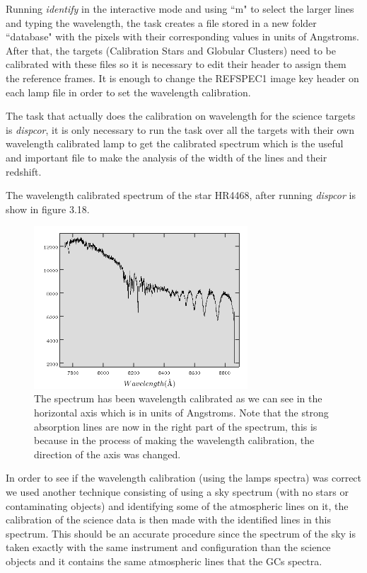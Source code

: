 Running \textit{identify} in the interactive mode and using ``m" to select the larger lines and typing the wavelength, the task creates a file stored in a new folder ``database" with the pixels with their corresponding values in units of Angstroms. After that, the targets (Calibration Stars and Globular Clusters) need to be calibrated with these files so it is necessary to edit their header to assign them the reference frames. It is enough to change the REFSPEC1 image key header on each lamp file in order to set the wavelength calibration. 

The task that actually does the calibration on wavelength for the science targets is \textit{dispcor}, it is only necessary to run the task over all the targets with their own wavelength calibrated lamp to get the calibrated spectrum which is the useful and important file to make the analysis of the width of the lines and their redshift.

The wavelength calibrated spectrum of the star HR4468, after running \textit{dispcor} is show in figure 3.18.

\begin{figure}[H]
\centering
\includegraphics[width=8cm]{images/calib_star_wave.png}
\caption[Wavelength calibrated spectrum of HR4468]{The spectrum has been wavelength calibrated as we can see in the horizontal axis which is in units of Angstroms. Note that the strong absorption lines are now in the right part of the spectrum, this is because in the process of making the wavelength calibration, the direction of the axis was changed.}
\end{figure}

In order to see if the wavelength calibration (using the lamps spectra) was correct we used another technique consisting of using a sky spectrum (with no stars or contaminating objects) and identifying some of the atmospheric lines on it, the calibration of the science data is then made with the identified lines in this spectrum. This should be an accurate procedure since the spectrum of the sky is taken exactly with the same instrument and configuration than the science objects and it contains the same atmospheric lines that the GCs spectra. 

